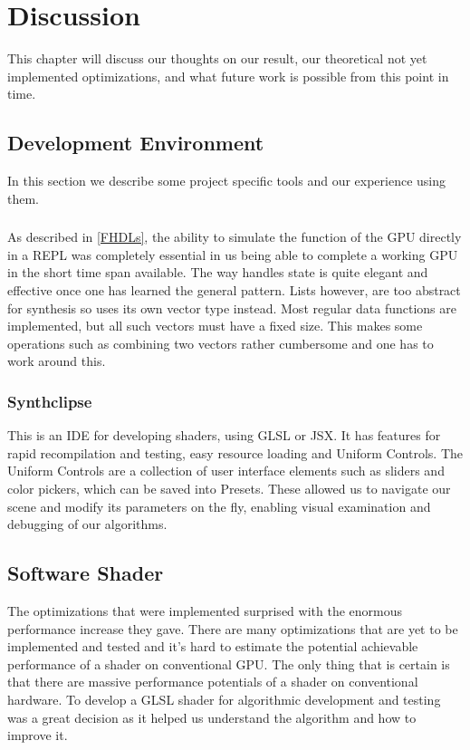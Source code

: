 \chapter{Discussion} 

	This chapter will discuss our thoughts on our result, our theoretical not
	yet	implemented optimizations, and what future work is possible from this
	point in time.
	
	\section{Development Environment}
		
		In this section we describe some project specific tools and our experience using them.
		
		\subsection{\clash} As described in \ref{FHDLs}, the ability to simulate
		the function of the GPU directly in a REPL\cite{repl} was completely
		essential in us being able to complete a working GPU in the short time span
		available. The way \clash{} handles state is quite elegant and effective
		once one has learned the general pattern. Lists however, are too abstract
		for synthesis so \clash{}  uses its own vector type instead. Most regular
		data functions are implemented, but all such vectors must have a fixed
		size. This makes some operations such as combining two vectors rather
		cumbersome and one has to work around this.
	
		\subsection{Synthclipse}
			This is an IDE for developing shaders, using GLSL or JSX. It has
			features for rapid recompilation and testing, easy resource loading 
			and	Uniform Controls. The Uniform Controls are a collection of user
			interface elements such as sliders and color pickers, which can be
			saved into Presets. These allowed us to navigate our scene and 
			modify its parameters on the fly, enabling visual examination and 
			debugging of our algorithms.		
		
		\section{Software Shader}

			The optimizations that were implemented surprised with the enormous performance increase they gave. There are many optimizations that are yet to be
			implemented and tested and it's hard to estimate the potential
			achievable performance of a shader on conventional GPU. The only thing that is certain is that
			there are massive performance potentials of a shader on conventional hardware. To develop a GLSL shader for algorithmic development and testing was a great decision as it helped us understand the algorithm and how to improve it.
			
